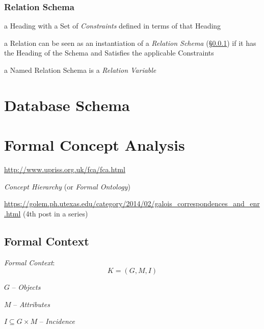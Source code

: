 \subsubsection{Relation Schema}\label{sec:relation_schema}

a Heading with a Set of \emph{Constraints} defined in terms of that Heading

a Relation can be seen as an instantiation of a \emph{Relation Schema}
(\S\ref{sec:relation_schema}) if it has the Heading of the Schema and Satisfies
the applicable Constraints

a Named Relation Schema is a \emph{Relation Variable}



\section{Database Schema}\label{sec:database_schema}

\section{Formal Concept Analysis}\label{sec:fca}


\url{http://www.upriss.org.uk/fca/fca.html}

\emph{Concept Hierarchy} (or \emph{Formal Ontology})

\url{https://golem.ph.utexas.edu/category/2014/02/galois_correspondences_and_enr.html}
(4th post in a series)



\subsection{Formal Context}\label{sec:formal_context}

\emph{Formal Context}:
\[
  K = (G,M,I)
\]

$G$ -- \emph{Objects}

$M$ -- \emph{Attributes}

$I \subseteq G \times M$ -- \emph{Incidence}



